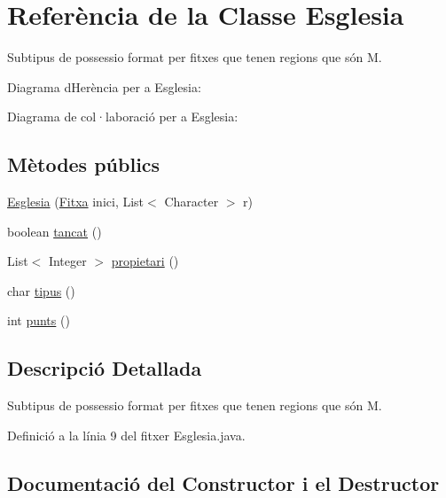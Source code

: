 \hypertarget{class_esglesia}{}\section{Referència de la Classe Esglesia}
\label{class_esglesia}


Subtipus de possessio format per fitxes que tenen regions que són M.  




Diagrama d\textquotesingle{}Herència per a Esglesia\+:


Diagrama de col·laboració per a Esglesia\+:
\subsection*{Mètodes públics}
\begin{DoxyCompactItemize}
\item 
\mbox{\hyperlink{class_esglesia_a331ac8536b82e3494630328400667c40}{Esglesia}} (\mbox{\hyperlink{class_fitxa}{Fitxa}} inici, List$<$ Character $>$ r)
\item 
boolean \mbox{\hyperlink{class_esglesia_a9e2478307777515b1bf7a3d138c55e92}{tancat}} ()
\item 
List$<$ Integer $>$ \mbox{\hyperlink{class_esglesia_a2048c0dd48f7065274dbf4ba4983358b}{propietari}} ()
\item 
char \mbox{\hyperlink{class_esglesia_a515988e0b57758b8da5c4c2351cace07}{tipus}} ()
\item 
int \mbox{\hyperlink{class_esglesia_ae5bce92364b7865d9683b2cba97b34a8}{punts}} ()
\end{DoxyCompactItemize}


\subsection{Descripció Detallada}
Subtipus de possessio format per fitxes que tenen regions que són M. 

Definició a la línia 9 del fitxer Esglesia.\+java.



\subsection{Documentació del Constructor i el Destructor}
\mbox{\label{class_esglesia_a331ac8536b82e3494630328400667c40}} 
